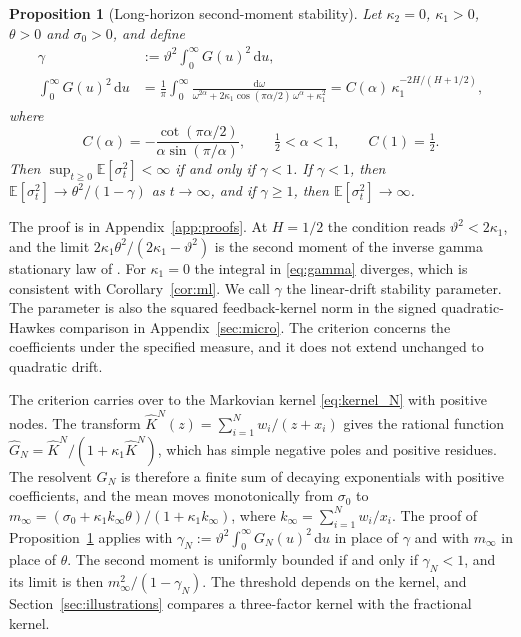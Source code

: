 \documentclass[11pt,a4paper]{article}
\newtheorem{proposition}[theorem]{Proposition}
\theoremstyle{definition}
\newcommand{\D}{\mathrm{d}}
\newcommand{\E}{\mathbb{E}}
\begin{document}
\begin{proposition}[Long-horizon second-moment stability]\label{prop:stationarity}
Let $\kappa_2=0$, $\kappa_1>0$, $\theta>0$ and $\sigma_0>0$, and define
\begin{equation}\label{eq:gamma}
\begin{split}
\gamma&:=\vartheta^2\int_0^\infty G(u)^2\,\D u,\\
\int_0^\infty G(u)^2\,\D u&=\frac1\pi\int_0^\infty\frac{\D\omega}{\omega^{2\alpha}+2\kappa_1\cos(\pi\alpha/2)\,\omega^\alpha+\kappa_1^2}=C(\alpha)\,\kappa_1^{-2H/(H+1/2)},
\end{split}
\end{equation}
where
\begin{equation*}
C(\alpha)=-\frac{\cot(\pi\alpha/2)}{\alpha\sin(\pi/\alpha)},\qquad \tfrac12<\alpha<1,\qquad C(1)=\tfrac12.
\end{equation*}
Then $\sup_{t\ge0}\E[\sigma_t^2]<\infty$ if and only if $\gamma<1$. If $\gamma<1$, then $\E[\sigma_t^2]\to\theta^2/(1-\gamma)$ as $t\to\infty$, and if $\gamma\ge1$, then $\E[\sigma_t^2]\to\infty$.
\end{proposition}

The proof is in Appendix~\ref{app:proofs}. At $H=1/2$ the condition reads $\vartheta^2<2\kappa_1$, and the limit $2\kappa_1\theta^2/(2\kappa_1-\vartheta^2)$ is the second moment of the inverse gamma stationary law of \citet{SeppRakhmonov2023}. For $\kappa_1=0$ the integral in \eqref{eq:gamma} diverges, which is consistent with Corollary~\ref{cor:ml}. We call $\gamma$ the linear-drift stability parameter. The parameter is also the squared feedback-kernel norm in the signed quadratic-Hawkes comparison in Appendix~\ref{sec:micro}. The criterion concerns the coefficients under the specified measure, and it does not extend unchanged to quadratic drift.

The criterion carries over to the Markovian kernel \eqref{eq:kernel_N} with positive nodes. The transform $\widehat K^N(z)=\sum_{i=1}^Nw_i/(z+x_i)$ gives the rational function $\widehat G_N=\widehat K^N/(1+\kappa_1\widehat K^N)$, which has simple negative poles and positive residues. The resolvent $G_N$ is therefore a finite sum of decaying exponentials with positive coefficients, and the mean moves monotonically from $\sigma_0$ to $m_\infty=(\sigma_0+\kappa_1k_\infty\theta)/(1+\kappa_1k_\infty)$, where $k_\infty=\sum_{i=1}^Nw_i/x_i$. The proof of Proposition~\ref{prop:stationarity} applies with $\gamma_N:=\vartheta^2\int_0^\infty G_N(u)^2\,\D u$ in place of $\gamma$ and with $m_\infty$ in place of $\theta$. The second moment is uniformly bounded if and only if $\gamma_N<1$, and its limit is then $m_\infty^2/(1-\gamma_N)$. The threshold depends on the kernel, and Section~\ref{sec:illustrations} compares a three-factor kernel with the fractional kernel.
\end{document}
